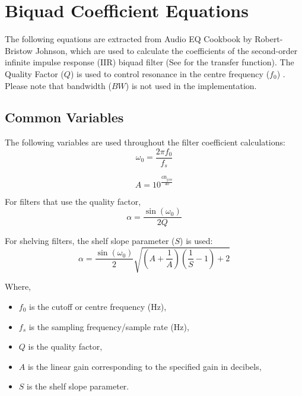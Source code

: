 \section{Biquad Coefficient Equations}
\label{app:biquad_equations}

The following equations are extracted from Audio EQ Cookbook by Robert-Bristow Johnson,
which are used to calculate the coefficients of the second-order infinite impulse response (IIR) biquad filter 
(See  for the transfer function). The Quality Factor ($Q$) is used to
control resonance in the centre frequency ($f_0$) \cite{cookbook}. Please note that bandwidth ($BW$) is not used 
in the implementation.

\subsection{Common Variables}

The following variables are used throughout the filter coefficient calculations:
\begin{equation}\label{eq:bq_omega}
    \omega_0 = \frac{2\pi f_0}{f_s}
\end{equation}

\begin{equation}
    A = 10^{\frac{\mathrm{dB}_{\mathrm{gain}}}{40}}
\end{equation}

For filters that use the quality factor,
\begin{equation}
    \alpha = \frac{\sin(\omega_0)}{2Q}
\end{equation}

For shelving filters, the shelf slope parameter ($S$) is used:
\begin{equation}
    \alpha =
\frac{\sin(\omega_0)}{2}
\sqrt{\left(A+\frac{1}{A}\right)\left(\frac{1}{S}-1\right)+2}
\end{equation}

Where,
\begin{itemize}
    \item $f_0$ is the cutoff or centre frequency (Hz),
    \item $f_s$ is the sampling frequency/sample rate (Hz),
    \item $Q$ is the quality factor,
    \item $A$ is the linear gain corresponding to the specified gain in decibels,
    \item $S$ is the shelf slope parameter.
\end{itemize}

